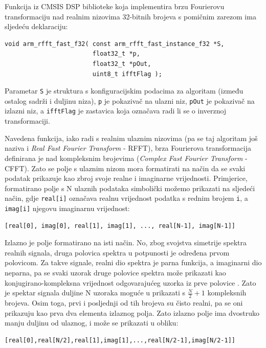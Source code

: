 Funkcija iz CMSIS DSP biblioteke koja implementira brzu Fourierovu transformaciju nad realnim nizovima 32-bitnih brojeva s pomičnim zarezom ima sljedeću deklaraciju:

\begin{lstlisting}
void arm_rfft_fast_f32( const arm_rfft_fast_instance_f32 *S,
                        float32_t *p,
                        float32_t *pOut,
                        uint8_t ifftFlag );	
\end{lstlisting}

Parametar \texttt{S} je struktura s konfiguracijskim podacima za algoritam (između ostalog sadrži i duljinu niza), \texttt{p} je pokazivač na ulazni niz, \texttt{pOut} je pokazivač na izlazni niz, a \texttt{ifftFlag} je zastavica koja označava radi li se o inverznoj transformaciji.

Navedena funkcija, iako radi s realnim ulaznim nizovima (pa se taj algoritam još naziva i \textit{Real Fast Fourier Transform} - RFFT), brza Fourierova transformacija definirana je nad kompleksnim brojevima (\textit{Complex Fast Fourier Transform} - CFFT). Zato se polje s ulaznim nizom mora formatirati na način da se svaki podatak prikazuje kao zbroj svoje realne i imaginarne vrijednosti. Primjerice, formatirano polje s N ulaznih podataka simbolički možemo prikazati na sljedeći način, gdje \texttt{real[i]} označava realnu vrijednost podatka s rednim brojem \texttt{i}, a \texttt{imag[i]} njegovu imaginarnu vrijednost:

\begin{lstlisting}
[real[0], imag[0], real[1], imag[1], ..., real[N-1], imag[N-1]]
\end{lstlisting}

Izlazno je polje formatirano na isti način. No, zbog svojstva simetrije spektra realnih signala, druga polovica spektra u potpunosti je određena prvom polovicom. Za takve signale, realni dio spektra je parna funkcija, a imaginarni dio neparna, pa se svaki uzorak druge polovice spektra može prikazati kao konjugirano-kompleksna vrijednost odgovarajućeg uzorka iz prve polovice \cite{petkovic_oos}. Zato je spektar signala duljine N uzoraka moguće u prikazati s $\frac{N}{2} + 1$ kompleksnih brojeva. Osim toga, prvi i posljednji od tih brojeva su čisto realni, pa se oni prikazuju kao prva dva elementa izlaznog polja. Zato izlazno polje ima dvostruko manju duljinu od ulaznog, i može se prikazati u obliku:

\begin{lstlisting}
[real[0],real[N/2],real[1],imag[1],...,real[N/2-1],imag[N/2-1]]
\end{lstlisting}

